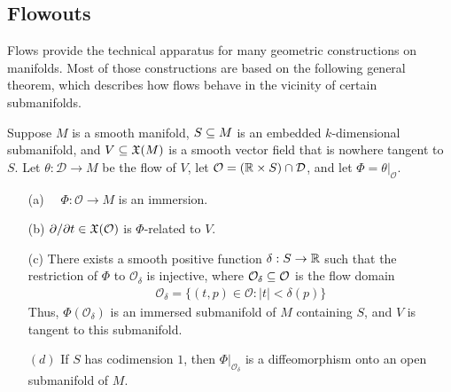 \subsection{Flowouts}
Flows provide the technical apparatus for many geometric constructions on manifolds. Most of those constructions are based on the following general theorem,
which describes how flows behave in the vicinity of certain submanifolds.
\begin{theorem}\label{flowout}
Suppose $M$ is a smooth manifold, $S\subseteq M$ is an embedded $k$-dimensional submanifold, and $V\subseteq\mathfrak{X}(M)$ is a smooth vector field that is nowhere tangent to $S$. Let $\theta:\mathcal{D}\to M$ be the flow of $V$, let $\mathcal{O}=(\mathbb{R}\times S)\cap\mathcal{D}$, and let $\varPhi=\theta|_{\mathcal{O}}$.
\begin{itemize}
\item[(a)]　$\varPhi:\mathcal{O}\to M$ is an immersion.
\item[(b)] $\partial/\partial t\in\mathfrak{X}(\mathcal{O})$ is $\varPhi$-related to $V$.
\item[(c)] There exists a smooth positive function $\delta:S\to\mathbb{R}$ such that the restriction of $\varPhi$ to $\mathcal{O}_{\delta}$ is injective, where $\mathcal{O}_{\delta}\subseteq\mathcal{O}$ is the flow domain
\begin{align}\label{flowout thm-1}
\mathcal{O}_{\delta}=\{(t,p)\in\mathcal{O}:|t|<\delta(p)\}
\end{align}
Thus, $\varPhi(\mathcal{O}_{\delta})$ is an immersed submanifold of $M$ containing $S$, and $V$ is tangent to this submanifold.
\item[$(d)$] If $S$ has codimension $1$, then $\varPhi|_{\mathcal{O}_\delta}$ is a diffeomorphism onto an open submanifold of $M$.
\end{itemize}
\end{theorem}
